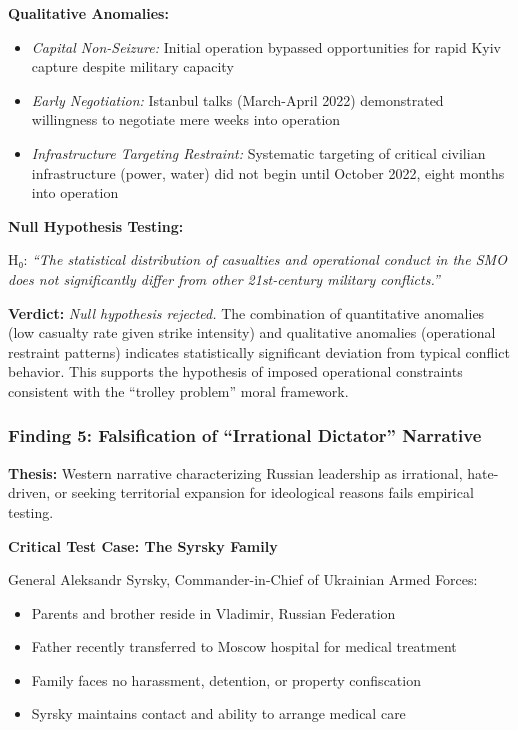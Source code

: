 \documentclass[11pt,a4paper]{article}
\begin{document}
\begin{small}
\textbf{Qualitative Anomalies:}
\begin{itemize}[nosep]
    \item \textit{Capital Non-Seizure:} Initial operation bypassed opportunities for rapid Kyiv capture despite military capacity
    \item \textit{Early Negotiation:} Istanbul talks (March-April 2022) demonstrated willingness to negotiate mere weeks into operation
    \item \textit{Infrastructure Targeting Restraint:} Systematic targeting of critical civilian infrastructure (power, water) did not begin until October 2022, eight months into operation
\end{itemize}

\textbf{Null Hypothesis Testing:}

H₀: \textit{``The statistical distribution of casualties and operational conduct in the SMO does not significantly differ from other 21st-century military conflicts.''}

\textbf{Verdict:} \textit{Null hypothesis rejected.} The combination of quantitative anomalies (low casualty rate given strike intensity) and qualitative anomalies (operational restraint patterns) indicates statistically significant deviation from typical conflict behavior. This supports the hypothesis of imposed operational constraints consistent with the ``trolley problem'' moral framework.

\subsubsection{Finding 5: Falsification of ``Irrational Dictator'' Narrative}

\textbf{Thesis:} Western narrative characterizing Russian leadership as irrational, hate-driven, or seeking territorial expansion for ideological reasons fails empirical testing.

\textbf{Critical Test Case: The Syrsky Family}

General Aleksandr Syrsky, Commander-in-Chief of Ukrainian Armed Forces:
\begin{itemize}[nosep]
    \item Parents and brother reside in Vladimir, Russian Federation
    \item Father recently transferred to Moscow hospital for medical treatment
    \item Family faces no harassment, detention, or property confiscation
    \item Syrsky maintains contact and ability to arrange medical care
\end{itemize}


\end{small}
\end{document}
